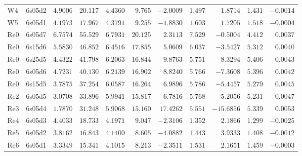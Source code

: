 \begin{table}[H]
{\begin{tabular}{llrrrrrrrrr}
W4 & 6s05d2 &$4.9006$ &$20.117$ &$4.4360$ &$9.765$ &$-2.0009$ &$1.497$ &$1.8714$ &$1.431$ &$-0.0014$ \\
W5 & 6s05d1 &$4.1973$ &$17.967$ &$4.3791$ &$9.255$ &$-1.8830$ &$1.603$ &$1.7205$ &$1.518$ &$-0.0004$ \\
Re0 & 6s05d7 &$6.7574$ &$55.529$ &$6.7931$ &$20.125$ &$2.3113$ &$7.529$ &$-0.5004$ &$4.412$ &$0.0037$ \\
Re0 & 6s15d6 &$5.5830$ &$46.852$ &$6.4516$ &$17.855$ &$5.0609$ &$6.037$ &$-3.5427$ &$5.312$ &$0.0040$ \\
Re0 & 6s25d5 &$4.4322$ &$41.798$ &$6.2063$ &$16.844$ &$9.8763$ &$5.751$ &$-8.3294$ &$5.406$ &$0.0043$ \\
Re0 & 6s05d6 &$4.7231$ &$40.130$ &$6.2139$ &$16.902$ &$8.8240$ &$5.766$ &$-7.3608$ &$5.396$ &$0.0042$ \\
Re0 & 6s15d5 &$3.7875$ &$37.254$ &$6.0587$ &$16.264$ &$6.9896$ &$5.786$ &$-5.4457$ &$5.279$ &$0.0045$ \\
Re2 & 6s05d5 &$3.0708$ &$33.896$ &$5.9941$ &$15.817$ &$6.7816$ &$5.768$ &$-5.2056$ &$5.231$ &$0.0047$ \\
Re3 & 6s05d4 &$1.7870$ &$31.248$ &$5.9068$ &$15.160$ &$17.4262$ &$5.551$ &$-15.6856$ &$5.339$ &$0.0053$ \\
Re4 & 6s05d3 &$4.4033$ &$18.733$ &$4.1971$ &$9.047$ &$-2.3106$ &$1.352$ &$2.1866$ &$1.299$ &$-0.0025$ \\
Re5 & 6s05d2 &$3.8162$ &$16.843$ &$4.1400$ &$8.605$ &$-4.0882$ &$1.443$ &$3.9333$ &$1.408$ &$-0.0012$ \\
Re6 & 6s05d1 &$3.3349$ &$15.341$ &$4.1015$ &$8.213$ &$-2.3511$ &$1.531$ &$2.1651$ &$1.459$ &$-0.0003$ \\
\hline
\end{tabular}
}
\end{table}
